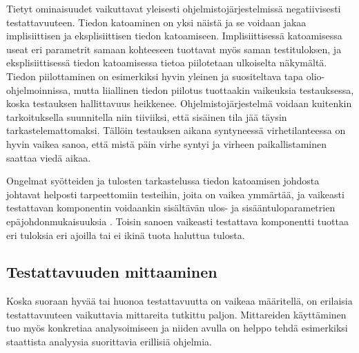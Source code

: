 \documentclass[finnish]{tktltiki2}
\numberwithin{table}{section}
\theoremstyle{definition}
\theoremstyle{remark}
\begin{document}
Tietyt ominaisuudet vaikuttavat yleisesti ohjelmistojärjestelmissä negatiivisesti testattavuuteen. Tiedon katoaminen on yksi näistä \citep{Voas:1995:STN:624607.625469} ja se voidaan jakaa implisiittisen ja eksplisiittisen tiedon katoamiseen. Implisiittisessä katoamisessa useat eri parametrit samaan kohteeseen tuottavat myös saman testituloksen, ja eksplisiittisessä tiedon katoamisessa tietoa piilotetaan ulkoiselta näkymältä. Tiedon piilottaminen on esimerkiksi hyvin yleinen ja suositeltava tapa olio-ohjelmoinnissa, mutta liiallinen tiedon piilotus tuottaakin vaikeuksia testauksessa, koska testauksen hallittavuus heikkenee. Ohjelmistojärjestelmä voidaan kuitenkin tarkoituksella suunnitella niin tiiviiksi, että sisäinen tila jää täysin tarkastelemattomaksi. Tällöin testauksen aikana syntyneessä virhetilanteessa on hyvin vaikea sanoa, että mistä päin virhe syntyi ja virheen paikallistaminen saattaa viedä aikaa.

Ongelmat syötteiden ja tulosten tarkastelussa tiedon katoamisen johdosta johtavat helposti tarpeettomiin testeihin, joita on vaikea ymmärtää, ja vaikeasti testattavan komponentin voidaankin sisältävän ulos- ja sisääntuloparametrien epäjohdonmukaisuuksia \citep{Voas:1995:STN:624607.625469}. Toisin sanoen vaikeasti testattava komponentti tuottaa eri tuloksia eri ajoilla tai ei ikinä tuota haluttua tulosta.   




\subsection{Testattavuuden mittaaminen} \label{testability_measure}


Koska suoraan hyvää tai huonoa testattavuutta on vaikeaa määritellä, on erilaisia testattavuuteen vaikuttavia mittareita tutkittu paljon. Mittareiden käyttäminen tuo myös konkretiaa analysoimiseen ja niiden avulla on helppo tehdä esimerkiksi staattista analyysia suorittavia erillisiä ohjelmia. 
\end{document}
